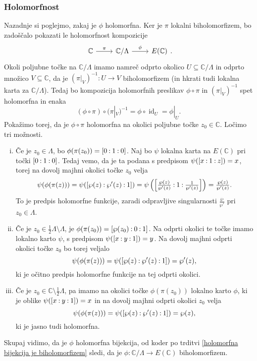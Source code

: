 \documentclass[mat1]{fmfdelo}
\numberwithin{equation}{section}
\newcommand{\C}{\mathbb C}
\newcommand{\oio}{\pcoor{0: 1 : 0}}
\newcommand{\inv}{^{-1}}
\newcommand{\torus}{\C/\Lambda}
\newcommand{\pcoor}[1]{%
\begingroup\lccode`~=`: \lowercase{\endgroup
\edef~}{\mathbin{\mathchar\the\mathcode`:}\nobreak}%
\left[%
\begingroup
\mathcode`:=\string"8000
#1%
\endgroup
\right]%
}
\DeclareMathOperator{\id}{id}
\theoremstyle{definition}
\begin{document}
\begin{dokaz}
    \subsubsection*{Holomorfnost}
    Nazadnje si poglejmo, zakaj je $\phi$ holomorfna. Ker je $\pi$ lokalni biholomorfizem, bo zadoščalo pokazati le holomorfnost kompozicije 
    \[\begin{tikzcd}
	    \C & \torus & E(\C)
	    \arrow["\pi", from=1-1, to=1-2]
	    \arrow["\phi", from=1-2, to=1-3]
    \end{tikzcd}.\]
    Okoli poljubne točke na $\torus$ imamo namreč odprto okolico $U\subseteq \torus$ in odprto množico $V\subseteq \C$, da je $(\pi|_V)\inv : U \to V$ biholomorfizem (in hkrati tudi lokalna karta za $\torus$). Tedaj bo kompozicija holomorfnih preslikav $\phi\circ \pi$ in $(\pi|_V)\inv$ spet holomorfna in enaka
    \[
        (\phi \circ \pi) \circ (\pi|_V)\inv = \phi \circ \id_U = \phi|_U.  
    \]
    Pokažimo torej, da je $\phi\circ\pi$ holomorfna na okolici poljubne točke $z_0 \in \C$. Ločimo tri možnosti.
    \begin{enumerate}[(i)]
        \item 
        Če je $z_0 \in \Lambda$, bo $\phi(\pi(z_0)) = \oio$. Naj bo $\psi$ lokalna karta na $E(\C)$ pri točki $\oio$. Tedaj vemo, da je ta podana s predpisom $\psi(\pcoor{x : 1 : z}) = x$, torej na dovolj majhni okolici točke $z_0$ velja 
        \[
            \psi(\phi(\pi(z))) = \psi(\pcoor{\wp(z) : \wp'(z) : 1}) = 
            \psi\left(\pcoor{\tfrac{\wp(z)}{\wp'(z)} : 1 : \tfrac{1}{\wp'(z)}}\right) = \tfrac{\wp(z)}{\wp'(z)}.
        \]
        To je predpis holomorfne funkcije, zaradi odpravljive singularnosti $\frac{\wp}{\wp'}$ pri $z_0 \in \Lambda$.

        \item
        Če je $z_0 \in \tfrac{1}{2}\Lambda\setminus\Lambda$, je $\phi(\pi(z_0)) = \pcoor{\wp(z_0) : 0 : 1}$. Na odprti okolici te točke imamo lokalno karto $\psi$, s predpisom $\psi(\pcoor{x : y : 1}) = y$. Na dovolj majhni odprti okolici točke $z_0$ bo torej veljalo
        \[
            \psi(\phi(\pi(z))) = \psi(\pcoor{\wp(z) : \wp'(z) : 1}) = \wp'(z),  
        \]
        ki je očitno predpis holomorfne funkcije na tej odprti okolici.

        \item
        Če je $z_0 \in \C\setminus\tfrac{1}{2}\Lambda$, pa imamo na okolici točke $\phi(\pi(z_0))$ lokalno karto $\phi$, ki je oblike $\psi(\pcoor{x : y : 1}) = x$ in na dovolj majhni odprti okolici $z_0$ velja
        \[
            \psi(\phi(\pi(z))) = \psi(\pcoor{\wp(z) : \wp'(z) : 1}) = \wp(z),  
        \]
        ki je jasno tudi holomorfna. 
    \end{enumerate}

    Skupaj vidimo, da je $\phi$ holomorfna bijekcija, od koder po trditvi \ref{holomorfna bijekcija je biholomorfizem} sledi, da je $\phi: \torus \to E(\C)$ biholomorfizem.
\end{dokaz}
\end{document}
